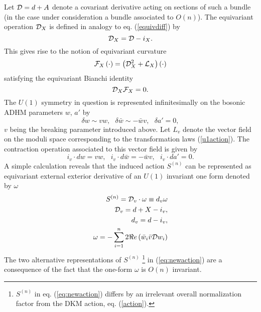 \documentclass[a4paper,12pt]{article}
\begin{document}
Let ${\cal D}=d+A$ denote a covariant derivative acting on 
sections of such a bundle (in the case under consideration a bundle 
associated to $O(n)$). The equivariant operation ${\cal D}_X$ is 
defined in analogy to eq. (\ref{equivdiff}) by 
\begin{equation}
{\cal D}_X ={\cal D}-i_X
\label{covequivdiff}.
\end{equation} 
This gives rise to the notion of equivariant curvature 
\begin{equation}
{\cal F}_X\left(\cdot \right) =\left({\cal D}_X^2 +{\cal L}_X \right)
\left(\cdot \right)
\label{equivcurvature}
\end{equation} 
satisfying the equivariant Bianchi identity
\begin{equation}
{\cal D}_X {\cal F}_X=0
\label{equivbianchi}. 
\end{equation}
The $U(1)$ symmetry in question is represented infinitesimally 
on the bosonic ADHM parameters $w$, $a'$ by   
\begin{equation}
\delta w\sim vw, \, \, \, \, \delta \bar{w}\sim -\bar{w} v , 
\, \, \, \, \delta a'=0, 
\label{u1action} 
\end{equation}  
$v$ being the breaking parameter introduced above. Let $L_v$ denote 
the vector field on the moduli space corresponding to the 
transformation laws (\ref{u1action}). The contraction operation 
associated to this vector field is given by
\begin{equation}
i_v \cdot d w = vw, \, \, \, \, i_v \cdot d \bar{w} = -\bar{w} v , 
\, \, \, \, i_v \cdot d a'=0. 
\label{contraction} 
\end{equation}    
A simple calculation reveals that the induced action $S^{(n)}$ can 
be represented as equivariant external exterior derivative of 
an $U(1)$ invariant one form denoted by $\omega$ 
\begin{eqnarray}
\label{eq:newaction} 
S^{(n)}={\cal D}_v \cdot \omega \equiv d_v \omega \\
{\cal D}_v =d+X-i_v, \nonumber \\
d_v =d-i_v , \nonumber \\
\label{eq:omega}
\omega = -\sum_{i=1}^n 2\Re e\left( \bar{w}_i \bar{v}{\cal D} w_i\right)
\end{eqnarray}  
The two alternative representations of $S^{(n)}$ \footnote{
$S^{(n)}$ in eq. (\ref{eq:newaction}) differs by an irrelevant 
overall normalization factor from the DKM action, eq. (\ref{action}).
} 
in 
(\ref{eq:newaction}) are a consequence of the fact that the 
one-form $\omega$ is $O(n)$ invariant.
\end{document}
